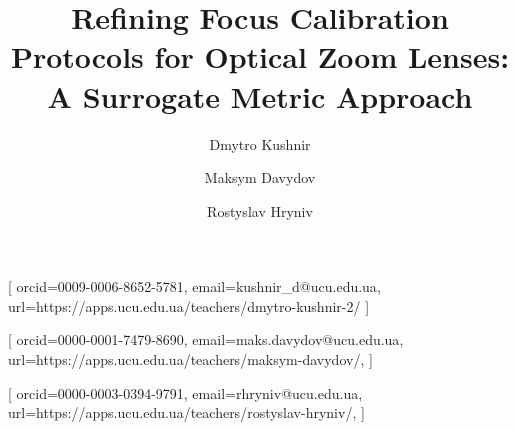 \documentclass[
hf,
]{ceurart}
\newcommand{\review}[1]{%
  \todo[color=blue!10, inline, size=\footnotesize]{REVIEW: #1}%
}
\begin{document}


\title{Refining Focus Calibration Protocols for Optical Zoom Lenses: A Surrogate Metric Approach}


\author[1]{Dmytro Kushnir}[%
orcid=0009-0006-8652-5781,
email={kushnir_d@ucu.edu.ua},
url={https://apps.ucu.edu.ua/teachers/dmytro-kushnir-2/}
]

\author[2]{Maksym Davydov}[%
orcid=0000-0001-7479-8690,
email={maks.davydov@ucu.edu.ua},
url={https://apps.ucu.edu.ua/teachers/maksym-davydov/},
]

\author[3]{Rostyslav Hryniv}[%
orcid=0000-0003-0394-9791,
email={rhryniv@ucu.edu.ua},
url={https://apps.ucu.edu.ua/teachers/rostyslav-hryniv/},
]


\address[1, 2, 3]{Ukrainian Catholic University Applied Science Faculty, Kozelnytska st., 2a, room 314, Lviv,  79026, Ukraine  }





\end{document}
